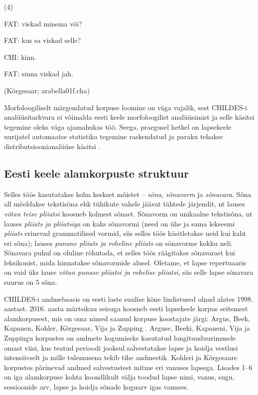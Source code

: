\documentclass[12pt]{article}
\begin{document}
(4)
\begin{description}
    \item*FAT: viskad minema või?
    \item*FAT: kus sa viskad selle?
    \item*CHI: kinn.
    \item*FAT: sinna viskad jah.
    \item(Kõrgesaar; arabella01f.cha)
\end{description}
\hfill


Morfoloogiliselt märgendatud korpuse loomine on väga vajalik, sest CHILDES-i analüüsitarkvara ei võimalda eesti keele morfoloogilist analüüsimist ja selle käsitsi tegemine oleks väga ajamahukas töö. Seega, praegusel hetkel on lapsekeele uurijatel automaatse statistika tegemine raskendatud ja paraku tehakse distributsioonianalüüse käsitsi \citep[78]{Argus2007}.

\subsection{Eesti keele alamkorpuste struktuur}

Selles töös kasutatakse kolm keskset mõistet -- \emph{sõna}, \emph{sõnavorm} ja \emph{sõnavara}. Sõna all mõeldakse tekstisõna ehk tühikute vahele jäävat tähtede järjendit, nt lauses \emph{võtan teise pliiatsi} koosneb kolmest sõnast. Sõnavorm on unikaalne tekstisõna, nt lauses \emph{pliiats ja pliiatsiga} on kaks sõnavormi (need on ühe ja sama lekseemi \emph{pliiats} erinevad grammatilised vormid, siis selles töös käsitletakse neid kui kaht eri sõna); lauses \emph{punane pliiats ja roheline pliiats} on sõnavorme kokku neli. Sõnavara puhul on oluline rõhutada, et selles töös räägitakse sõnavarast kui leksikonist, mida hinnatakse sõnavormide alusel. Oletame, et lapse repertuaaris on vaid üks lause \emph{võtan punase pliiatsi ja rohelise pliiatsi}, siis selle lapse sõnavara suurus on 5 sõna.

CHILDES-i andmebaasis on eesti laste suulise kõne lindistused olnud alates 1998. aastast. 2016. aasta märtsikuu seisuga koosneb eesti lapsekeele korpus seitsmest alamkorpusest, mis on oma nimed saanud korpuse koostajate järgi: Argus, Beek, Kapanen, Kohler, Kõrgesaar, Vija ja Zupping \citep{CHILDES}. Arguse, Beeki, Kapaneni, Vija ja Zuppingu korpustes on andmete kogumiseks kasutatud longituuduurimusele omast viisi, kus teatud perioodi jooksul salvestatakse lapse ja hoidja vestlusi intensiivselt ja mille tulemusena tekib tihe andmestik. Kohleri ja Kõrgesaare korpustes pärinevad andmed salvestustest mitme eri vanuses lapsega. Lisades 1--6 on iga alamkorpuse kohta koondlikult välja toodud lapse nimi, vanus, sugu, sessioonide arv, lapse ja hoidja sõnade koguarv igas vanuses.
\end{document}
